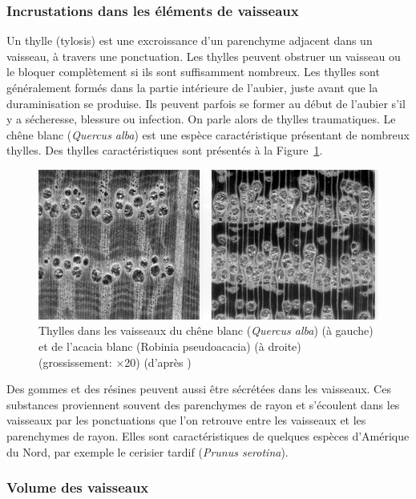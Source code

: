 \subsubsection{Incrustations dans les éléments de vaisseaux}

Un thylle (tylosis) est une excroissance d'un parenchyme adjacent dans un vaisseau, à travers une ponctuation. Les thylles peuvent obstruer un vaisseau ou le bloquer complètement si ils sont suffisamment nombreux. Les thylles sont généralement formés dans la partie intérieure de l'aubier, juste avant que la duraminisation se produise.  Ils peuvent parfois se former au début de l'aubier s'il y a sécheresse, blessure ou infection. On parle alors de thylles traumatiques. Le chêne blanc (\textit{Quercus alba}) est une espèce caractéristique présentant de nombreux thylles. Des thylles caractéristiques sont présentés à la Figure~\ref{fig:thylles}. \\

\begin{figure}[h]
	\centering
	\includegraphics[scale=0.6]{img/ch4_thylles}
	\caption{Thylles dans les vaisseaux du chêne blanc (\textit{Quercus alba}) (à gauche) et de l'acacia blanc (Robinia pseudoacacia) (à droite) (grossissement: $\times$20) (d'après \cite{hoadley1990identifying})}
\label{fig:thylles}
\end{figure}

Des gommes et des résines peuvent aussi être sécrétées dans les vaisseaux.  Ces substances proviennent souvent des parenchymes de rayon et s'écoulent dans les vaisseaux par les ponctuations que l'on retrouve entre les vaisseaux et les parenchymes de rayon.  Elles sont caractéristiques de quelques espèces d'Amérique du Nord, par exemple le cerisier tardif (\textit{Prunus serotina}).

\subsubsection{Volume des vaisseaux}

